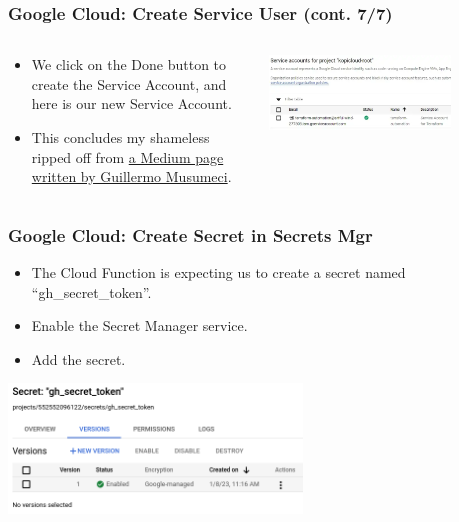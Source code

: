 \documentclass[aspectratio=169]{beamer}
\begin{document}
\begin{frame}
	\frametitle{Google Cloud: Create Service User (cont. 7/7)}
	\begin{columns}
		\begin{column}{0.5\textwidth}
			\begin{itemize}
				\item We click on the Done button to create the Service Account, and here is our new Service Account.
				\item This concludes my shameless ripped off from \href{https://gmusumeci.medium.com/how-to-create-a-service-account-for-terraform-in-gcp-google-cloud-platform-f75a0cf918d1}{a Medium page written by Guillermo Musumeci}.
		\end{itemize}
		\end{column}
		\begin{column}{0.5\textwidth}
			\begin{center}
				\includegraphics[width=0.75\textwidth]{../images/gcp-serv-acct7.png}
			\end{center}
		\end{column}
	\end{columns}
\end{frame}

\begin{frame}
	\frametitle{Google Cloud: Create Secret in Secrets Mgr}

	\begin{itemize}
		\item The Cloud Function is expecting us to create a secret named ``gh\_secret\_token''.
		\item Enable the Secret Manager service.
		\item Add the secret.
	\end{itemize}
	\begin{center}
		\includegraphics[width=0.585\textwidth]{../images/gcp-secret.png}
	\end{center}
\end{frame}
\end{document}
